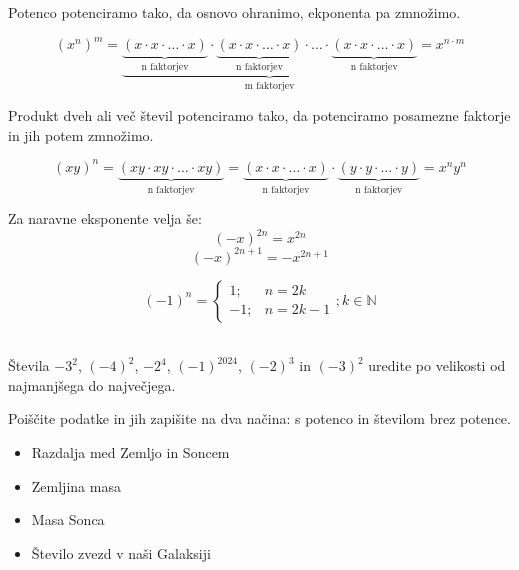             Potenco potenciramo tako, da osnovo ohranimo, ekponenta pa zmnožimo.

            $$ (x^n)^m=\underbrace{\underbrace{(x\cdot x\cdot\ldots\cdot x)}_\text{n faktorjev}\cdot\underbrace{(x\cdot x\cdot\ldots\cdot x)}_\text{n faktorjev}\cdot\ldots\cdot\underbrace{(x\cdot x\cdot\ldots\cdot x)}_\text{n faktorjev}}_\text{m faktorjev}=x^{n\cdot m}$$
            
    

    
            Produkt dveh ali več števil potenciramo tako, da potenciramo posamezne faktorje in jih potem zmnožimo.

            $$ (xy)^n =\underbrace{(xy\cdot xy\cdot\ldots\cdot xy)}_\text{n faktorjev}=\underbrace{(x\cdot x\cdot\ldots\cdot x)}_\text{n faktorjev}\cdot\underbrace{(y\cdot y\cdot\ldots\cdot y)}_\text{n faktorjev}=x^n y^n$$
            

            Za naravne eksponente velja še:
            $$(-x)^{2n}=x^{2n}$$
            $$(-x)^{2n+1}=-x^{2n+1}$$

            $$(-1)^n=\begin{cases}
                1; &n=2k \\
                -1; &n=2k-1
            \end{cases}; k\in\mathbb{N}$$
\newline ~\newline
            
            \begin{naloga}
                    Števila $-3^2$, $(-4)^2$, $-2^4$, $(-1)^{2024}$, $(-2)^3$ in $(-3)^2$ uredite po velikosti od najmanjšega do največjega. 
            \end{naloga}

                \begin{naloga}
                    Poiščite podatke in jih zapišite na dva načina: s potenco in številom brez potence.
                    \begin{itemize}
                        \item Razdalja med Zemljo in Soncem
                        \item Zemljina masa
                        \item Masa Sonca
                        \item Število zvezd v naši Galaksiji
                    \end{itemize}
                \end{naloga}
    

